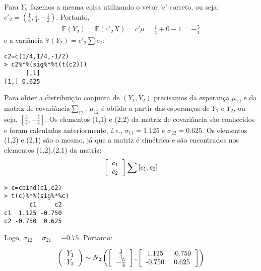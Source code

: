\documentclass[11pt,a4paper]{book}
\begin{document}
\begin{enumerate}
			Para $Y_2$ fazemos a mesma coisa utilizando o vetor 'c' correto, ou seja: $c'_2=(\frac{1}{4},\frac{1}{4},-\frac{1}{2})$.
			Portanto,
			\begin{eqnarray*}
				\mathbb{E}(Y_2)=\mathbb{E}(c'_2X)=c'\mu = \frac{1}{4}+0-1=-\frac{5}{4}
			\end{eqnarray*}			
			e a variância $\mathbb{V}(Y_2)=c'_2\sum c_2$:
			\begin{lstlisting}
c2=c(1/4,1/4,-1/2)
> c2%*%(sig%*%t(t(c2)))
      [,1]
[1,] 0.625
			\end{lstlisting}
			
			Para obter a distribuição conjunta de $(Y_1,Y_2)$ precisamos da esperança $\mu_{12}$ e da matriz de covariância$\sum_{12}$.
			$\mu_{12}$ é obtido a partir das esperanças de $Y_1$ e $Y_2$, ou seja, $[\frac{3}{4},-\frac{5}{4}]$.
			Os elementos (1,1) e (2,2) da matriz de covariância são conhecidos e foram calculados anteriormente, \textit{i.e.}, $\sigma_{11}=1.125$ e $\sigma_{22}=0.625$.
			Os elementos (1,2) e (2,1) são o mesmo, já que a matriz é simétrica e são encontrados nos elementos (1,2),(2,1) da matriz:
			\begin{eqnarray*}
				\left[
				\begin{tabular}{c}
				$c_1$\\
				$c_2$\\
				\end{tabular}
				\right]
				\sum \left[c_1,c_2
				\right]
			\end{eqnarray*}
			\begin{lstlisting}
> c=cbind(c1,c2)
> t(c)%*%(sig%*%c)
       c1     c2
c1  1.125 -0.750
c2 -0.750  0.625
			\end{lstlisting}
			Logo, $\sigma_{12}=\sigma_{21}=-0.75$.
			Portanto:
			
			\begin{eqnarray*}
			\left(
			\begin{tabular}{c}
			$Y_1$\\
			$Y_2$\\
			\end{tabular}
			\right)\sim N_2
			\left(
			\left[
			\begin{tabular}{c c}
			$\frac{3}{4}$\\
			$-\frac{5}{4}$\\
			\end{tabular}
			\right],
			\left[
			\begin{tabular}{c c}
			 1.125 & -0.750\\
			-0.750  & 0.625\\
			\end{tabular}
			\right]
			\right)
			\end{eqnarray*}	
			

\end{enumerate}
\end{document}
